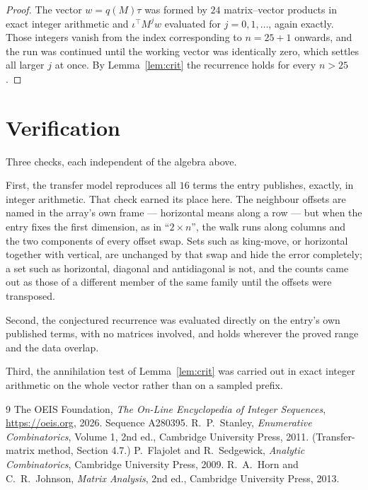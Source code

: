 \documentclass[11pt,a4paper]{article}
\theoremstyle{plain}
\theoremstyle{definition}
\begin{document}
\begin{proof}
The vector $w=q(M)\tau$ was formed by $24$ matrix--vector products in exact integer
arithmetic and $\iota^{\!\top}M^{j}w$ evaluated for $j=0,1,\dots$, again exactly. Those
integers vanish from the index corresponding to $n=25+1$ onwards, and the run was
continued until the working vector was identically zero, which settles all larger $j$ at once.
By Lemma~\ref{lem:crit} the recurrence holds for every $n>25$.
\end{proof}

\section{Verification}

Three checks, each independent of the algebra above.

First, the transfer model reproduces all $16$ terms the entry publishes, exactly, in
integer arithmetic. That check earned its place here. The neighbour offsets are named in the
array's own frame --- horizontal means along a row --- but when the entry fixes the first
dimension, as in ``$2\times n$'', the walk runs along columns and the two components of every
offset swap. Sets such as king-move, or horizontal together with vertical, are unchanged by
that swap and hide the error completely; a set such as horizontal, diagonal and antidiagonal
is not, and the counts came out as those of a different member of the same family until the
offsets were transposed.

Second, the conjectured recurrence was evaluated directly on the entry's own published terms,
with no matrices involved, and holds wherever the proved range and the data overlap.

Third, the annihilation test of Lemma~\ref{lem:crit} was carried out in exact integer
arithmetic on the whole vector rather than on a sampled prefix.

\begin{thebibliography}{9}
 The OEIS Foundation, \emph{The On-Line Encyclopedia of Integer
Sequences}, \url{https://oeis.org}, 2026. Sequence A280395.
 R.~P.~Stanley, \emph{Enumerative Combinatorics}, Volume 1, 2nd ed.,
Cambridge University Press, 2011. (Transfer-matrix method, Section 4.7.)
 P.~Flajolet and R.~Sedgewick, \emph{Analytic Combinatorics}, Cambridge
University Press, 2009.
 R.~A.~Horn and C.~R.~Johnson, \emph{Matrix Analysis}, 2nd ed., Cambridge
University Press, 2013.
\end{thebibliography}
\end{document}
